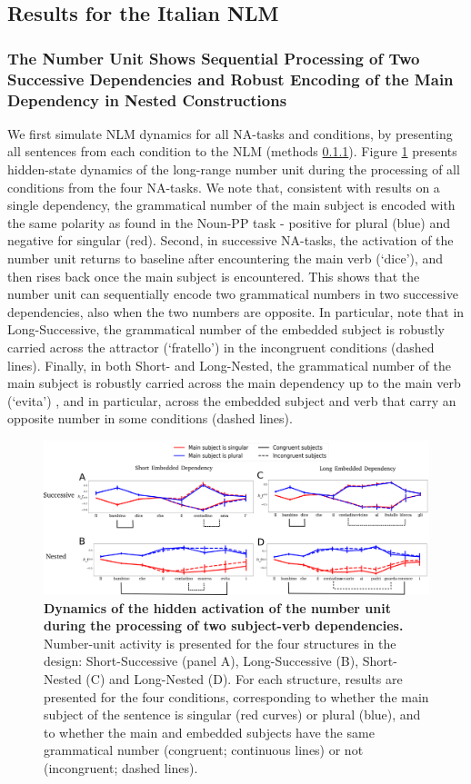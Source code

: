 \subsection{Results for the Italian NLM}
\subsubsection{The Number Unit Shows Sequential Processing of Two Successive Dependencies and Robust Encoding of the Main Dependency in Nested Constructions}
We first simulate NLM dynamics for all NA-tasks and conditions, by presenting all sentences from each condition to the NLM (methods \ref{}). Figure \ref{fig:2by2_dynamics} presents hidden-state dynamics of the long-range number unit during the processing of all conditions from the four NA-tasks. We note that, consistent with results on a single dependency, the grammatical number of the main subject is encoded with the same polarity as found in the Noun-PP task - positive for plural (blue) and negative for singular (red). Second, in successive NA-tasks, the activation of the number unit returns to baseline after encountering the main verb (`dice'), and then rises back once the main subject is encountered. This shows that the number unit can sequentially encode two grammatical numbers in two successive dependencies, also when the two numbers are opposite. In particular, note that in Long-Successive, the grammatical number of the embedded subject is robustly carried across the attractor (`fratello') in the incongruent conditions (dashed lines). Finally, in both Short- and Long-Nested, the grammatical number of the main subject is robustly carried across the main dependency up to the main verb (`evita') , and in particular, across the embedded subject and verb that carry an opposite number in some conditions (dashed lines).

\begin{figure}
    \centering
    \includegraphics[width=\textwidth]{figures/model_activations.png}
    \caption{\textbf{Dynamics of the hidden activation of the number unit during the processing of two subject-verb dependencies.} Number-unit activity is presented for the four structures in the design: Short-Successive (panel A), Long-Successive (B), Short-Nested (C) and Long-Nested (D). For each structure, results are presented for the four conditions, corresponding to whether the main subject of the sentence is singular (red curves) or plural (blue), and to whether the main and embedded subjects have the same grammatical number (congruent; continuous lines) or not (incongruent; dashed lines).}
    \label{fig:2by2_dynamics}
\end{figure}


